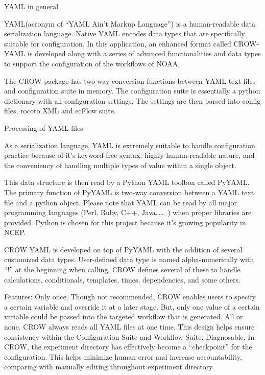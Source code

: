 Y\-A\-M\-L in general

Y\-A\-M\-L(acronym of “\-Y\-A\-M\-L Ain't Markup Language”) is a human-\/readable data serialization language. Native Y\-A\-M\-L encodes data types that are specifically suitable for configuration. In this application, an enhanced format called C\-R\-O\-W-\/\-Y\-A\-M\-L is developed along with a series of advanced functionalities and data types to support the configuration of the workflows of N\-O\-A\-A.

The C\-R\-O\-W package has two-\/way conversion functions between Y\-A\-M\-L text files and configuration suite in memory. The configuration suite is essentially a python dictionary with all configuration settings. The settings are then parsed into config files, rocoto X\-M\-L and ec\-Flow suite.

Processing of Y\-A\-M\-L files

As a serialization language, Y\-A\-M\-L is extremely suitable to handle configuration practice because of it’s keyword-\/free syntax, highly human-\/readable nature, and the conveniency of handling multiple types of value within a single object.

This data structure is then read by a Python Y\-A\-M\-L toolbox called Py\-Y\-A\-M\-L. The primary function of Py\-Y\-A\-M\-L is two-\/way conversion between a Y\-A\-M\-L text file and a python object. Please note that Y\-A\-M\-L can be read by all major programming languages (Perl, Ruby, C++, Java…… ) when proper libraries are provided. Python is chosen for this project because it’s growing popularity in N\-C\-E\-P.

C\-R\-O\-W Y\-A\-M\-L is developed on top of Py\-Y\-A\-M\-L with the addition of several customized data types. User-\/defined data type is named alpha-\/numerically with “!” at the beginning when calling. C\-R\-O\-W defines several of these to handle calculations, conditionals, templates, times, dependencies, and some others.

Features\-: Only once. Though not recommended, C\-R\-O\-W enables users to specify a certain variable and override it at a later stage. But, only one value of a certain variable could be passed into the targeted workflow that is generated. All or none. C\-R\-O\-W always reads all Y\-A\-M\-L files at one time. This design helps ensure consistency within the Configuration Suite and Workflow Suite. Diagnosable. In C\-R\-O\-W, the experiment directory has effectively become a “checkpoint” for the configuration. This helps minimize human error and increase accountability, comparing with manually editing throughout experiment directory.

